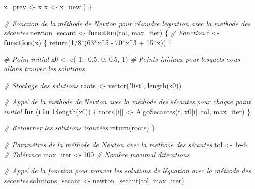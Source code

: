 \documentclass[
]{article}
\newenvironment{Shaded}{\begin{snugshade}}{\end{snugshade}}
\newcommand{\CommentTok}[1]{\textcolor[rgb]{0.56,0.35,0.01}{\textit{#1}}}
\newcommand{\ControlFlowTok}[1]{\textcolor[rgb]{0.13,0.29,0.53}{\textbf{#1}}}
\newcommand{\DecValTok}[1]{\textcolor[rgb]{0.00,0.00,0.81}{#1}}
\newcommand{\FloatTok}[1]{\textcolor[rgb]{0.00,0.00,0.81}{#1}}
\newcommand{\FunctionTok}[1]{\textcolor[rgb]{0.00,0.00,0.00}{#1}}
\newcommand{\NormalTok}[1]{#1}
\newcommand{\OtherTok}[1]{\textcolor[rgb]{0.56,0.35,0.01}{#1}}
\newcommand{\SpecialCharTok}[1]{\textcolor[rgb]{0.00,0.00,0.00}{#1}}
\newcommand{\StringTok}[1]{\textcolor[rgb]{0.31,0.60,0.02}{#1}}
\begin{document}
\begin{Shaded}
\begin{Highlighting}[]
\NormalTok{    x\_prev }\OtherTok{\textless{}{-}}\NormalTok{ x}
\NormalTok{    x }\OtherTok{\textless{}{-}}\NormalTok{ x\_new}
\NormalTok{  \}}
\NormalTok{\}}

\CommentTok{\# Fonction de la méthode de Newton pour résoudre l\textquotesingle{}équation avec la méthode des sécantes}
\NormalTok{newton\_secant }\OtherTok{\textless{}{-}} \ControlFlowTok{function}\NormalTok{(tol, max\_iter) \{}
  \CommentTok{\# Fonction}
\NormalTok{  f }\OtherTok{\textless{}{-}} \ControlFlowTok{function}\NormalTok{(x) \{}
    \FunctionTok{return}\NormalTok{(}\DecValTok{1}\SpecialCharTok{/}\DecValTok{8}\SpecialCharTok{*}\NormalTok{(}\DecValTok{63}\SpecialCharTok{*}\NormalTok{x}\SpecialCharTok{\^{}}\DecValTok{5} \SpecialCharTok{{-}} \DecValTok{70}\SpecialCharTok{*}\NormalTok{x}\SpecialCharTok{\^{}}\DecValTok{3} \SpecialCharTok{+} \DecValTok{15}\SpecialCharTok{*}\NormalTok{x))}
\NormalTok{  \}}

  \CommentTok{\# Point initial}
\NormalTok{  x0 }\OtherTok{\textless{}{-}} \FunctionTok{c}\NormalTok{(}\SpecialCharTok{{-}}\DecValTok{1}\NormalTok{, }\SpecialCharTok{{-}}\FloatTok{0.5}\NormalTok{, }\DecValTok{0}\NormalTok{, }\FloatTok{0.5}\NormalTok{, }\DecValTok{1}\NormalTok{)  }\CommentTok{\# Points initiaux pour lesquels nous allons trouver les solutions}

  \CommentTok{\# Stockage des solutions}
\NormalTok{  roots }\OtherTok{\textless{}{-}} \FunctionTok{vector}\NormalTok{(}\StringTok{"list"}\NormalTok{, }\FunctionTok{length}\NormalTok{(x0))}

  \CommentTok{\# Appel de la méthode de Newton avec la méthode des sécantes pour chaque point initial}
  \ControlFlowTok{for}\NormalTok{ (i }\ControlFlowTok{in} \DecValTok{1}\SpecialCharTok{:}\FunctionTok{length}\NormalTok{(x0)) \{}
\NormalTok{    roots[[i]] }\OtherTok{\textless{}{-}} \FunctionTok{AlgoSecantes}\NormalTok{(f, x0[i], tol, max\_iter)}
\NormalTok{  \}}

  \CommentTok{\# Retourner les solutions trouvées}
  \FunctionTok{return}\NormalTok{(roots)}
\NormalTok{\}}

\CommentTok{\# Paramètres de la méthode de Newton avec la méthode des sécantes}
\NormalTok{tol }\OtherTok{\textless{}{-}} \FloatTok{1e{-}6}  \CommentTok{\# Tolérance}
\NormalTok{max\_iter }\OtherTok{\textless{}{-}} \DecValTok{100}  \CommentTok{\# Nombre maximal d\textquotesingle{}itérations}

\CommentTok{\# Appel de la fonction pour trouver les solutions de l\textquotesingle{}équation avec la méthode des sécantes}
\NormalTok{solutions\_secant }\OtherTok{\textless{}{-}} \FunctionTok{newton\_secant}\NormalTok{(tol, max\_iter)}
\end{Highlighting}
\end{Shaded}
\end{document}
